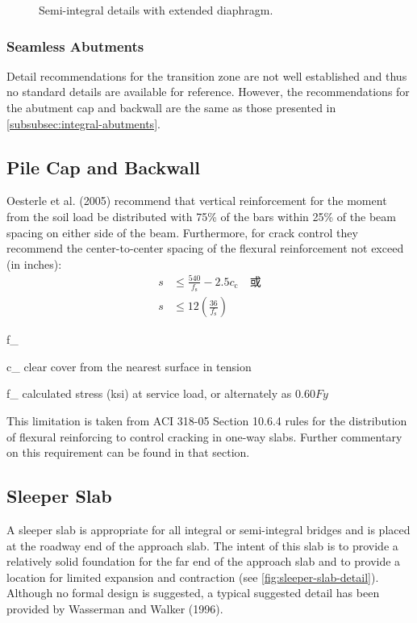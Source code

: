 \begin{figure}
  \caption{Semi-integral details with extended diaphragm.}
  \label{fig:semi-integral-details-extended-diaphragm}
\end{figure}



\subsubsection{Seamless Abutments}
Detail recommendations for the transition zone are not well established and thus no standard details are available for reference. However, the recommendations for the abutment cap and backwall are the same as those presented in \cref{subsubsec:integral-abutments}.

\subsection{Pile Cap and Backwall}
Oesterle et al. (2005) recommend that vertical reinforcement for the moment from the soil load be distributed
with 75\% of the bars within 25\% of the beam spacing on either side of the beam. Furthermore, for crack control they
recommend the center-to-center spacing of the flexural reinforcement not exceed (in inches):
\begin{align}
  s &\leqslant \frac{540}{f_\text{s}}-2.5c_\text{c} \quad \text{或}\\
  s &\leqslant 12 \left(\frac{36}{f_\text{s}}\right)
\end{align}
\begin{EqDesc}{f_}
  \item[c_\text{c}] clear cover from the nearest surface in tension
  \item[f_\text{s}] calculated stress (ksi) at service load, or alternately as $0.60Fy$
\end{EqDesc}

This limitation is taken from ACI 318-05 Section 10.6.4 rules for the distribution of flexural reinforcing to control cracking in one-way slabs. Further commentary on this requirement can be found in that section.

\subsection{Sleeper Slab}
A sleeper slab is appropriate for all integral or semi-integral bridges and is placed at the roadway end of the
approach slab. The intent of this slab is to provide a relatively solid foundation for the far end of the approach slab
and to provide a location for limited expansion and contraction (see \cref{fig:sleeper-slab-detail}). Although no formal design is
suggested, a typical suggested detail has been provided by Wasserman and Walker (1996).

